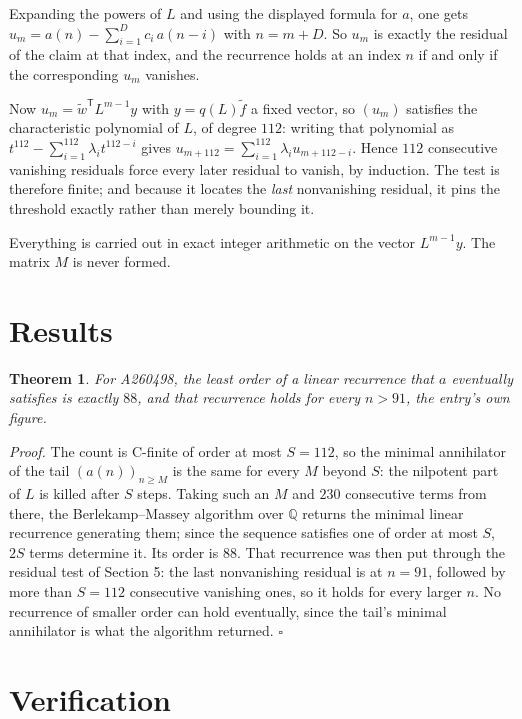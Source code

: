 \documentclass[11pt]{article}
\newtheorem{theorem}{Theorem}
\theoremstyle{definition}
\begin{document}
Expanding the powers of $L$ and using the displayed formula for $a$, one gets $u_m = a(n) - \sum_{i=1}^{D} c_i\,a(n-i)$ with $n = m + D$. So $u_m$ is exactly the residual of the claim at that index, and the recurrence holds at an index $n$ if and only if the corresponding $u_m$ vanishes.

Now $u_m = \tilde w^{\mathsf T} L^{m-1} y$ with $y = q(L)\tilde f$ a fixed vector, so $(u_m)$ satisfies the characteristic polynomial of $L$, of degree $112$: writing that polynomial as $t^{112} - \sum_{i=1}^{112} \lambda_i t^{112-i}$ gives $u_{m+112} = \sum_{i=1}^{112} \lambda_i u_{m+112-i}$. Hence $112$ consecutive vanishing residuals force every later residual to vanish, by induction. The test is therefore finite; and because it locates the {\itshape last} nonvanishing residual, it pins the threshold exactly rather than merely bounding it.

Everything is carried out in exact integer arithmetic on the vector $L^{m-1}y$. The matrix $M$ is never formed.

\section{Results}

\begin{theorem} For A260498, the least order of a linear recurrence that $a$ eventually satisfies is exactly $88$, and that recurrence holds for every $n > 91$, the entry's own figure.\end{theorem}

{\itshape Proof.} The count is C-finite of order at most $S = 112$, so the minimal annihilator of the tail $(a(n))_{n \ge M}$ is the same for every $M$ beyond $S$: the nilpotent part of $L$ is killed after $S$ steps. Taking such an $M$ and $230$ consecutive terms from there, the Berlekamp--Massey algorithm over $\mathbb{Q}$ returns the minimal linear recurrence generating them; since the sequence satisfies one of order at most $S$, $2S$ terms determine it. Its order is $88$. That recurrence was then put through the residual test of Section 5: the last nonvanishing residual is at $n = 91$, followed by more than $S = 112$ consecutive vanishing ones, so it holds for every larger $n$. No recurrence of smaller order can hold eventually, since the tail's minimal annihilator is what the algorithm returned. $\square$

\section{Verification}
\end{document}
